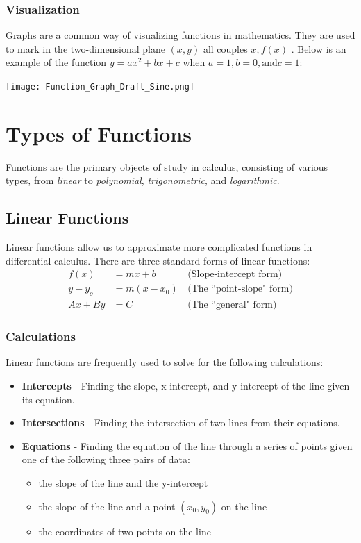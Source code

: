 \documentclass[11pt,oneside]{book}              %
\begin{document}
\subsubsection{Visualization}
Graphs are a common way of visualizing functions in mathematics. They are used to mark in the two-dimensional plane $(x,y)$ all couples $x, f(x)$ \cite{mathfeld}. Below is an example of the function $y=ax^2+bx+c$ when $a = 1, b = 0, \text{and} c = 1$:
\begin{center}\texttt{[image: Function\_Graph\_Draft\_Sine.png]}\end{center}

\section{Types of Functions}
Functions are the primary objects of study in calculus, consisting of various types, from \textit{linear} to \textit{polynomial}, \textit{trigonometric}, and \textit{logarithmic}. \cite{oregonstate}

\subsection{Linear Functions}
Linear functions allow us to approximate more complicated functions in differential calculus. There are three standard forms of linear functions:
\begin{align*}
f(x) &= mx + b &\,\text{(Slope-intercept form)} \\
y - y_o &= m(x - x_0) &\, \text{(The ``point-slope" form)} \\
Ax + By &= C &\, \text{(The ``general" form)}
\end{align*}

\subsubsection{Calculations}
Linear functions are frequently used to solve for the following calculations:
\begin{itemize}
	\item {\bf Intercepts} - Finding the slope, x-intercept, and y-intercept of the line given its equation.
	\item {\bf Intersections } - Finding the intersection of two lines from their equations.
	\item {\bf Equations } - Finding the equation of the line through a series of points given one of the following three pairs of data:
	\begin{itemize}
		\item the slope of the line and the y-intercept
		\item the slope of the line and a point $(x_0,y_0)$ on the line
		\item the coordinates of two points on the line
	\end{itemize}
\end{itemize}
\end{document}

